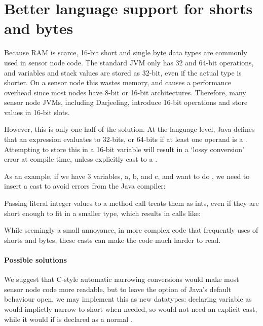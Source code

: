 \section{Better language support for shorts and bytes}
\label{sec-small-datatypes}
Because RAM is scarce, 16-bit short and single byte data types are commonly used in sensor node code. The standard JVM only has 32 and 64-bit operations, and variables and stack values are stored as 32-bit, even if the actual type is shorter. On a sensor node this wastes memory, and causes a performance overhead since most nodes have 8-bit or 16-bit architectures. Therefore, many sensor node JVMs, including Darjeeling, introduce 16-bit operations and store values in 16-bit slots.

However, this is only one half of the solution. At the language level, Java defines that an expression evaluates to 32-bits, or 64-bits if at least one operand is a . Attempting to store this in a 16-bit variable will result in a `lossy conversion' error at compile time, unless explicitly cast to a .

As an example, if we have 3  variables, a, b, and c, and want to do 
, we need to insert a cast to avoid errors from the Java compiler:


Passing literal integer values to a method call treats them as ints, even if they are short enough to fit in a smaller type, which results in calls like: 


While seemingly a small annoyance, in more complex code that frequently uses of shorts and bytes, these casts can make the code much harder to read.

\paragraph{Possible solutions}

We suggest that C-style automatic narrowing conversions would make most sensor node code more readable, but to leave the option of Java's default behaviour open, we may implement this as new datatypes: declaring variable  as  would implictly narrow to short when needed, so  would not need an explicit cast, while it would if  is declared as a normal .




